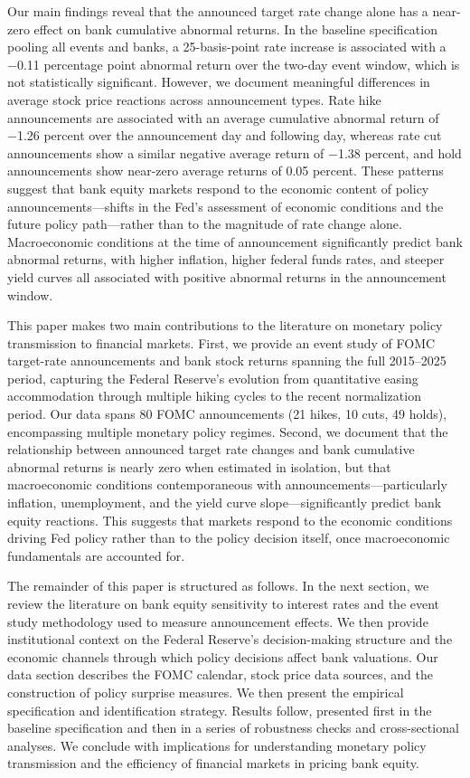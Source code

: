 \documentclass{article}
\begin{document}
Our main findings reveal that the announced target rate change alone has a near-zero effect on bank cumulative abnormal returns. In the baseline specification pooling all events and banks, a 25-basis-point rate increase is associated with a −0.11 percentage point abnormal return over the two-day event window, which is not statistically significant. However, we document meaningful differences in average stock price reactions across announcement types. Rate hike announcements are associated with an average cumulative abnormal return of −1.26 percent over the announcement day and following day, whereas rate cut announcements show a similar negative average return of −1.38 percent, and hold announcements show near-zero average returns of 0.05 percent. These patterns suggest that bank equity markets respond to the economic content of policy announcements—shifts in the Fed's assessment of economic conditions and the future policy path—rather than to the magnitude of rate change alone. Macroeconomic conditions at the time of announcement significantly predict bank abnormal returns, with higher inflation, higher federal funds rates, and steeper yield curves all associated with positive abnormal returns in the announcement window.

This paper makes two main contributions to the literature on monetary policy transmission to financial markets. First, we provide an event study of FOMC target-rate announcements and bank stock returns spanning the full 2015--2025 period, capturing the Federal Reserve's evolution from quantitative easing accommodation through multiple hiking cycles to the recent normalization period. Our data spans 80 FOMC announcements (21 hikes, 10 cuts, 49 holds), encompassing multiple monetary policy regimes. Second, we document that the relationship between announced target rate changes and bank cumulative abnormal returns is nearly zero when estimated in isolation, but that macroeconomic conditions contemporaneous with announcements—particularly inflation, unemployment, and the yield curve slope—significantly predict bank equity reactions. This suggests that markets respond to the economic conditions driving Fed policy rather than to the policy decision itself, once macroeconomic fundamentals are accounted for.

The remainder of this paper is structured as follows. In the next section, we review the literature on bank equity sensitivity to interest rates and the event study methodology used to measure announcement effects. We then provide institutional context on the Federal Reserve's decision-making structure and the economic channels through which policy decisions affect bank valuations. Our data section describes the FOMC calendar, stock price data sources, and the construction of policy surprise measures. We then present the empirical specification and identification strategy. Results follow, presented first in the baseline specification and then in a series of robustness checks and cross-sectional analyses. We conclude with implications for understanding monetary policy transmission and the efficiency of financial markets in pricing bank equity.
\end{document}
